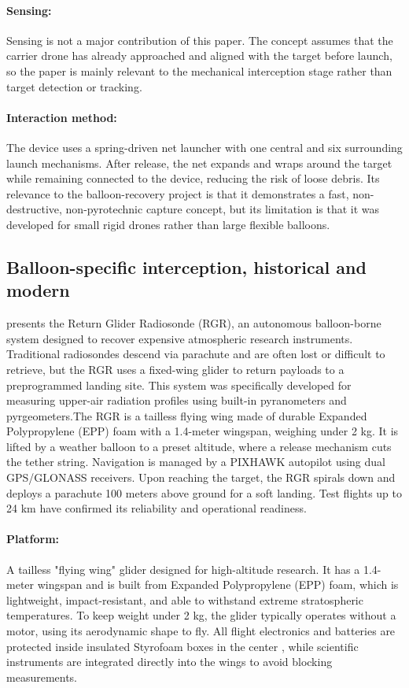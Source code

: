 \paragraph{Sensing:} Sensing is not a major contribution of this paper. The concept assumes that the carrier drone has already approached and aligned with the target before launch, so the paper is mainly relevant to the mechanical interception stage rather than target detection or tracking.

\paragraph{Interaction method:} The device uses a spring-driven net launcher with one central and six surrounding launch mechanisms. After release, the net expands and wraps around the target while remaining connected to the device, reducing the risk of loose debris. Its relevance to the balloon-recovery project is that it demonstrates a fast, non-destructive, non-pyrotechnic capture concept, but its limitation is that it was developed for small rigid drones rather than large flexible balloons. 


\subsection{Balloon-specific interception, historical and modern}

\cite{Krauchi2016ReturnMeasurements} presents the Return Glider Radiosonde (RGR), an autonomous balloon-borne system designed to recover expensive atmospheric research instruments. Traditional radiosondes descend via parachute and are often lost or difficult to retrieve, but the RGR uses a fixed-wing glider to return payloads to a preprogrammed landing site. This system was specifically developed for measuring upper-air radiation profiles using built-in pyranometers and pyrgeometers.The RGR is a tailless flying wing made of durable Expanded Polypropylene (EPP) foam with a 1.4-meter wingspan, weighing under 2 kg. It is lifted by a weather balloon to a preset altitude, where a release mechanism cuts the tether string. Navigation is managed by a PIXHAWK autopilot using dual GPS/GLONASS receivers. Upon reaching the target, the RGR spirals down and deploys a parachute 100 meters above ground for a soft landing. Test flights up to 24 km have confirmed its reliability and operational readiness.

\paragraph{Platform:} A tailless "flying wing" glider designed for high-altitude research. It has a 1.4-meter wingspan and is built from Expanded Polypropylene (EPP) foam, which is lightweight, impact-resistant, and able to withstand extreme stratospheric temperatures. To keep weight under 2 kg, the glider typically operates without a motor, using its aerodynamic shape to fly. All flight electronics and batteries are protected inside insulated Styrofoam boxes in the center , while scientific instruments are integrated directly into the wings to avoid blocking measurements.

